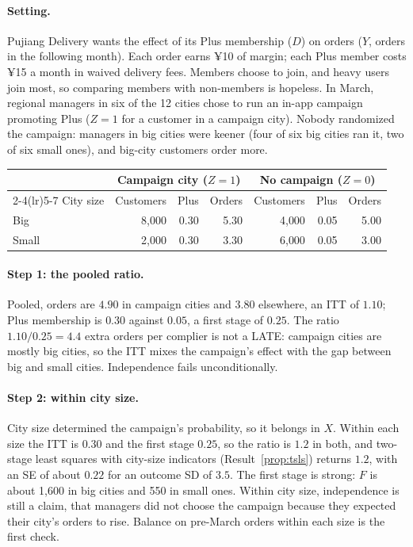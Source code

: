 \documentclass[11pt]{article}
\begin{document}
\sectiontwo

\paragraph{Setting.} Pujiang Delivery wants the effect of its Plus membership ($D$) on orders ($Y$, orders in the following month).
Each order earns ¥10 of margin; each Plus member costs ¥15 a month in waived delivery fees. Members choose to join, and heavy
users join most, so comparing members with non-members is hopeless. In March, regional managers in six of the 12 cities chose
to run an in-app campaign promoting Plus ($Z = 1$ for a customer in a campaign city). Nobody randomized the campaign: managers
in big cities were keener (four of six big cities ran it, two of six small ones), and big-city customers order more.

\begin{center}
\small
\begin{tabular}{lrrrrrr}
\toprule
& \multicolumn{3}{c}{Campaign city ($Z = 1$)} & \multicolumn{3}{c}{No campaign ($Z = 0$)} \\
\cmidrule(lr){2-4}\cmidrule(lr){5-7}
City size & Customers & Plus & Orders & Customers & Plus & Orders \\
\midrule
Big & 8{,}000 & 0.30 & 5.30 & 4{,}000 & 0.05 & 5.00 \\
Small & 2{,}000 & 0.30 & 3.30 & 6{,}000 & 0.05 & 3.00 \\
\bottomrule
\end{tabular}
\end{center}

\paragraph{Step 1: the pooled ratio.} Pooled, orders are $4.90$ in campaign cities and $3.80$ elsewhere, an ITT of $1.10$; Plus
membership is $0.30$ against $0.05$, a first stage of $0.25$. The ratio $1.10/0.25 = 4.4$ extra orders per complier is not a
LATE: campaign cities are mostly big cities, so the ITT mixes the campaign's effect with the gap between big and small cities.
Independence fails unconditionally.

\paragraph{Step 2: within city size.} City size determined the campaign's probability, so it belongs in $X$. Within each size
the ITT is $0.30$ and the first stage $0.25$, so the ratio is $1.2$ in both, and two-stage least squares with city-size
indicators (Result~\ref{prop:tsls}) returns $1.2$, with an SE of about $0.22$ for an outcome SD of $3.5$. The first stage is
strong: $F$ is about 1{,}600 in big cities and 550 in small ones. Within city size, independence is still a claim, that managers
did not choose the campaign because they expected their city's orders to rise. Balance on pre-March orders within each size
is the first check.
\end{document}
